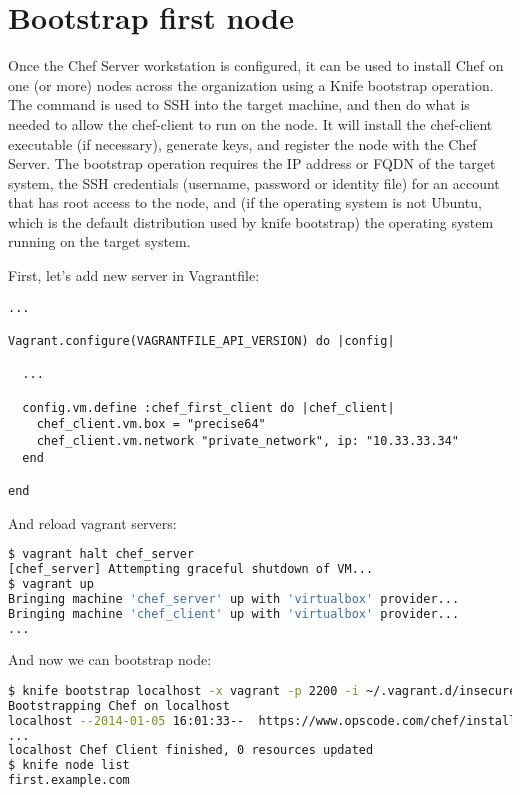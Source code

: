 \section{Bootstrap first node}
\label{sec:server-node}

Once the Chef Server workstation is configured, it can be used to install Chef on one (or more) nodes across the organization using a Knife bootstrap operation. The  command is used to SSH into the target machine, and then do what is needed to allow the chef-client to run on the node. It will install the chef-client executable (if necessary), generate keys, and register the node with the Chef Server. The bootstrap operation requires the IP address or FQDN of the target system, the SSH credentials (username, password or identity file) for an account that has root access to the node, and (if the operating system is not Ubuntu, which is the default distribution used by knife bootstrap) the operating system running on the target system.

First, let's add new server in Vagrantfile:

\begin{lstlisting}[label=lst:my-server-cloud-node1,title=my-server-cloud/Vagrantfile]
...

Vagrant.configure(VAGRANTFILE_API_VERSION) do |config|

  ...

  config.vm.define :chef_first_client do |chef_client|
    chef_client.vm.box = "precise64"
    chef_client.vm.network "private_network", ip: "10.33.33.34"
  end

end
\end{lstlisting}

And reload vagrant servers:

\begin{lstlisting}[language=Bash,label=lst:my-server-cloud-node2]
$ vagrant halt chef_server
[chef_server] Attempting graceful shutdown of VM...
$ vagrant up
Bringing machine 'chef_server' up with 'virtualbox' provider...
Bringing machine 'chef_client' up with 'virtualbox' provider...
...
\end{lstlisting}

And now we can bootstrap node:

\begin{lstlisting}[language=Bash,label=lst:my-server-cloud-node3]
$ knife bootstrap localhost -x vagrant -p 2200 -i ~/.vagrant.d/insecure_private_key -N first.example.com --sudo
Bootstrapping Chef on localhost
localhost --2014-01-05 16:01:33--  https://www.opscode.com/chef/install.sh
...
localhost Chef Client finished, 0 resources updated
$ knife node list
first.example.com
\end{lstlisting}

